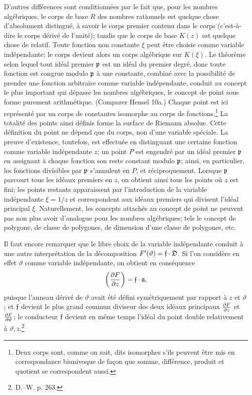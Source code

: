 D'autres différences sont conditionnées par le fait que, pour les nombres algébriques, le corps de base \(R\) des nombres rationnels est quelque chose d'absolument distingué, à savoir le corps premier contenu dans le corps (c'est-à-dire le corps dérivé de l'unité); tandis que le corps de base \(K(z)\) est quelque chose de relatif. Toute fonction non constante \(\xi\) peut être choisie comme variable indépendante; le corps devient alors un corps algébrique sur \(K(\xi)\). Le théorème selon lequel tout idéal premier \(\mathfrak p\) est un idéal du premier degré, donc toute fonction est congrue modulo \(\mathfrak p\) à une constante, combiné avec la possibilité de prendre une fonction arbitraire comme variable indépendante, conduit au concept le plus important qui dépasse les nombres algébriques, le concept de point sous forme purement arithmétique. (Comparer Hensel 10a.) \og{}Chaque point est ici représenté par un corps de constantes isomorphe au corps de fonctions.\fg{}\footnote{Deux corps sont, comme on sait, dits \og{}isomorphes\fg{} s'ils peuvent être mis en correspondance biunivoque de façon que somme, différence, produit et quotient se correspondent aussi.} La totalité des points ainsi définis forme la \og{}surface de Riemann absolue\fg{}. Cette définition du point ne dépend que du corps, non d'une variable spéciale. La preuve d'existence, toutefois, est effectuée en distinguant une certaine fonction comme variable indépendante \(z\); un point \(P\) est engendré par un idéal premier \(\mathfrak p\) en assignant à chaque fonction son reste constant modulo \(\mathfrak p\); ainsi, en particulier, les fonctions divisibles par \(\mathfrak p\) s'annulent en \(P\), et réciproquement. Lorsque \(\mathfrak p\) parcourt tous les idéaux premiers en \(z\), on obtient ainsi tous les points où \(z\) est fini; les points restants apparaissent par l'introduction de la variable indépendante \(\xi=1/z\) et correspondent aux idéaux premiers qui divisent l'idéal principal \(\xi\). Naturellement, les concepts attachés au concept de point ne peuvent pas non plus avoir d'analogue pour les nombres algébriques; tels le concept de polygone, de classe de polygones, de dimension d'une classe de polygones, etc.

Il faut encore remarquer que le libre choix de la variable indépendante conduit à une autre interprétation de la décomposition \(F'(\vartheta)=\mathfrak f\cdot\mathfrak D\). Si l'on considère en effet \(\vartheta\) comme variable indépendante, on obtient en conséquence
\[
\left(\frac{\partial F}{\partial z}\right)=\mathfrak f\cdot\mathfrak a,
\]
puisque l'anneau dérivé de \(\vartheta\) avait été défini symétriquement par rapport à \(z\) et \(\vartheta\); et \(\mathfrak f\) devient le plus grand commun diviseur des deux idéaux principaux \(\frac{\partial F}{\partial z}\) et \(\frac{\partial F}{\partial\vartheta}\); le conducteur \(\mathfrak f\) devient en même temps l'\og{}idéal du point double\fg{} relativement à \(\vartheta,z\).\footnote{D.--W. p. 263.}

